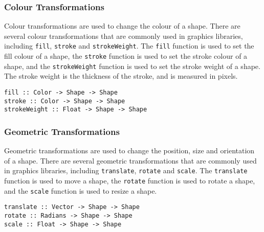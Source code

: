 \documentclass[../main.tex]{subfiles}
\begin{document}
            \subsubsection{Colour Transformations}
                Colour transformations are used to change the colour of a shape.
                There are several colour transformations that are commonly used in graphics
                    libraries, including \verb|fill|, \verb|stroke| and \verb|strokeWeight|.
                The \verb|fill| function is used to set the fill colour of a shape, the
                    \verb|stroke| function is used to set the stroke colour of a shape, and the
                    \verb|strokeWeight| function is used to set the stroke weight of a shape.
                The stroke weight is the thickness of the stroke, and is measured in pixels.

                \begin{lstlisting}[label={lst:colour}, caption={The colour transformation functions.}]
fill :: Color -> Shape -> Shape
stroke :: Color -> Shape -> Shape
strokeWeight :: Float -> Shape -> Shape\end{lstlisting}

            \subsubsection{Geometric Transformations}
                Geometric transformations are used to change the position, size and orientation
                    of a shape.
                There are several geometric transformations that are commonly used in graphics
                    libraries, including \verb|translate|, \verb|rotate| and \verb|scale|.
                The \verb|translate| function is used to move a shape, the \verb|rotate|
                    function is used to rotate a shape, and the \verb|scale| function is used to
                    resize a shape.

                \begin{lstlisting}[label={lst:geometric}, caption={The geometric transformation functions.}]
translate :: Vector -> Shape -> Shape
rotate :: Radians -> Shape -> Shape
scale :: Float -> Shape -> Shape\end{lstlisting}
\end{document}
